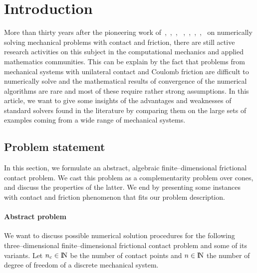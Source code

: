 \section{Introduction}



More than thirty years after the pioneering work of~\cite{Panagiotopoulos_IA1975},~\cite{Necas.ea1980},~\cite{Haslinger1983,Haslinger1984,Haslinger.Panagiotopoulos_PRSE1984}, ~\cite{z-DelPieroMaceri_CISM1983,z-DelPieroMaceri_CISM1985},~\cite{Katona_IJNAMG1983},~\cite{Chaudhary.Bathe_CS1986},~\cite{Jean.Moreau1987},~\cite{Mitsopoulou.Doudoumis1988} on numerically solving mechanical problems with contact and friction, there are still active research activities on this subject in the computational mechanics and applied mathematics communities.  This can be explain by the fact that {problems from} mechanical systems with unilateral contact and Coulomb friction are difficult to numerically solve and the mathematical results of convergence of the numerical algorithms are rare and most of these require rather strong assumptions. In this article, we want to give some insights of the advantages and weaknesses of standard solvers found in the literature by comparing them on the large sets of examples coming from a wide range of mechanical systems.

\subsection{Problem statement}
In this section, we formulate an abstract, algebraic finite--dimensional frictional contact problem. We cast this problem as a complementarity problem over cones, and discuss the properties of the latter.
We end by presenting some instances with contact and friction phenomenon that fits our problem description.

\paragraph{Abstract problem}

We want to discuss possible numerical solution procedures for the following three--dimensional finite--dimensional frictional contact problem and some of its variants.  Let $n_c\in \mathrm{I\!N}$ be the number of contact points and $n\in\mathrm{I\!N}$ the number of degree of freedom of a discrete mechanical system.

